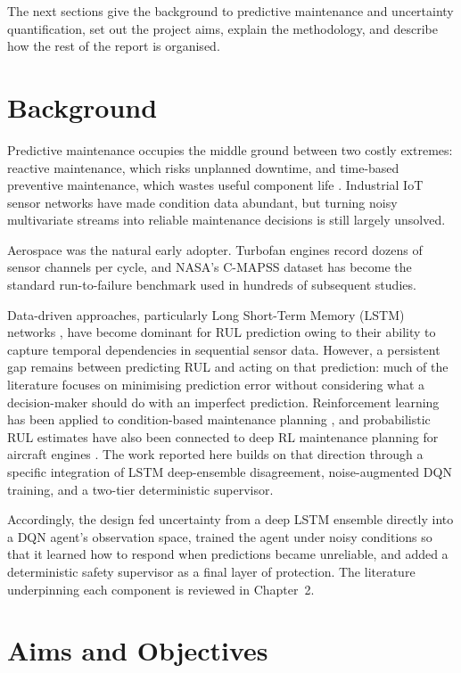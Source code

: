 \documentclass[12pt,a4paper]{report}
\begin{document}
The next sections give the background to predictive maintenance and uncertainty quantification, set out the project aims, explain the methodology, and describe how the rest of the report is organised.

\section{Background}

Predictive maintenance occupies the middle ground between two costly extremes: reactive maintenance, which risks unplanned downtime, and time-based preventive maintenance, which wastes useful component life \citep{si2011remaining}. Industrial IoT sensor networks have made condition data abundant, but turning noisy multivariate streams into reliable maintenance decisions is still largely unsolved.

Aerospace was the natural early adopter. Turbofan engines record dozens of sensor channels per cycle, and NASA's C-MAPSS dataset \citep{saxena2008damage} has become the standard run-to-failure benchmark used in hundreds of subsequent studies.


Data-driven approaches, particularly Long Short-Term Memory (LSTM) networks \citep{hochreiter1997long}, have become dominant for RUL prediction owing to their ability to capture temporal dependencies in sequential sensor data. However, a persistent gap remains between predicting RUL and acting on that prediction: much of the literature focuses on minimising prediction error without considering what a decision-maker should do with an imperfect prediction. Reinforcement learning has been applied to condition-based maintenance planning \citep{zhang2019deep}, and probabilistic RUL estimates have also been connected to deep RL maintenance planning for aircraft engines \citep{lee2023deep}. The work reported here builds on that direction through a specific integration of LSTM deep-ensemble disagreement, noise-augmented DQN training, and a two-tier deterministic supervisor.


Accordingly, the design fed uncertainty from a deep LSTM ensemble directly into a DQN agent's observation space, trained the agent under noisy conditions so that it learned how to respond when predictions became unreliable, and added a deterministic safety supervisor as a final layer of protection. The literature underpinning each component is reviewed in Chapter~2.

\section{Aims and Objectives}
\label{sec:objectives}
\end{document}
